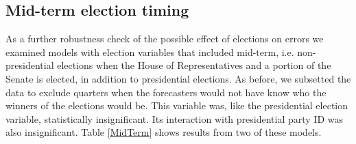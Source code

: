 \documentclass[a4paper]{article}
\begin{document}
\subsection*{Mid-term election timing}

As a further robustness check of the possible effect of elections on errors we examined models with election variables that included mid-term, i.e. non-presidential elections when the House of Representatives and a portion of the Senate is elected, in addition to presidential elections. As before, we subsetted the data to exclude quarters when the forecasters would not have know who the winners of the elections would be. This variable was, like the presidential election variable, statistically insignificant. Its interaction with presidential party ID was also insignificant. Table \ref{MidTerm} shows results from two of these models.
\end{document}
